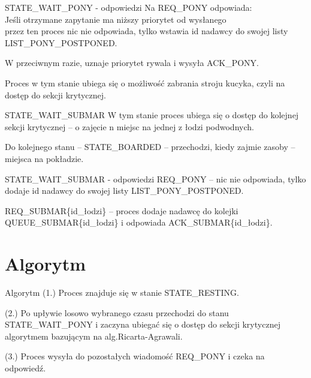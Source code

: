 \documentclass{beamer}
\newcommand\tab[1][1cm]{\hspace*{#1}}
\begin{document}
\begin{frame}{STATE\_WAIT\_PONY - odpowiedzi}
    \internallinenumbers
    \resetlinenumber[1]
    Na REQ\_PONY odpowiada: \\
        \tab[0.5cm] Jeśli otrzymane zapytanie ma niższy priorytet od wysłanego \\
        \tab[0.5cm] przez ten proces nic nie odpowiada, tylko wstawia id nadawcy 
        \tab[0.5cm] do swojej listy LIST\_PONY\_POSTPONED.
        
        \vspace{0.3cm}
        \tab[0.5cm] W przeciwnym razie, uznaje priorytet rywala i wysyła ACK\_PONY.

    \vspace{0.3cm}
    Proces w tym stanie ubiega się o możliwość zabrania stroju kucyka, czyli na dostęp do sekcji krytycznej.
\end{frame}

\begin{frame}{STATE\_WAIT\_SUBMAR}
    \internallinenumbers
    \resetlinenumber[1]
    W tym stanie proces ubiega się o dostęp do kolejnej sekcji krytycznej – o zajęcie n miejsc na jednej z łodzi podwodnych.

    \vspace{1cm}
    Do kolejnego stanu – STATE\_BOARDED – przechodzi, kiedy zajmie zasoby – miejsca na pokładzie.
\end{frame}

\begin{frame}{STATE\_WAIT\_SUBMAR - odpowiedzi}
    \internallinenumbers
    \resetlinenumber[1]
    REQ\_PONY – nic nie odpowiada, tylko dodaje id nadawcy do swojej listy LIST\_PONY\_POSTPONED.

    \vspace{1cm}
    REQ\_SUBMAR\{id\_łodzi\} – proces dodaje nadawcę do kolejki QUEUE\_SUBMAR\{id\_łodzi\} i odpowiada ACK\_SUBMAR\{id\_łodzi\}. 
\end{frame}

\section{Algorytm}
\begin{frame}{Algorytm}
    \internallinenumbers
    (1.) Proces znajduje się w stanie STATE\_RESTING.

    \vspace{0.5cm}
    (2.) Po upływie losowo wybranego czasu przechodzi do stanu STATE\_WAIT\_PONY i zaczyna ubiegać się o dostęp do sekcji krytycznej algorytmem bazującym na alg.Ricarta-Agrawali.

    \vspace{0.5cm}
    (3.) Proces wysyła do pozostałych wiadomość REQ\_PONY i czeka na odpowiedź.
\end{frame}
\end{document}
